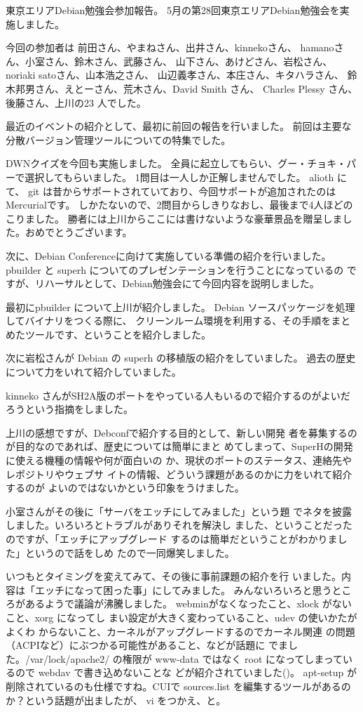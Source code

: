 \documentclass[mingoth,a4paper]{jsarticle}
\begin{document}
東京エリアDebian勉強会参加報告。
5月の第28回東京エリアDebian勉強会を実施しました。

今回の参加者は
前田さん、やまねさん、出井さん、kinnekoさん、
hamanoさん、小室さん、鈴木さん、武藤さん、
山下さん、あけどさん、岩松さん、
noriaki satoさん、山本浩之さん、
山辺義孝さん、本庄さん、キタハラさん、
鈴木邦男さん、えとーさん、荒木さん、David Smith さん、
Charles Plessy さん、後藤さん、上川の23 人でした。

最近のイベントの紹介として、最初に前回の報告を行いました。
前回は主要な分散バージョン管理ツールについての特集でした。

DWNクイズを今回も実施しました。
全員に起立してもらい、グー・チョキ・パーで選択してもらいました。
1問目は一人しか正解しませんでした。
alioth にて、 git は昔からサポートされていており、今回サポートが追加されたのはMercurialです。
しかたないので、2問目からしきりなおし、最後まで4人ほどのこりました。
勝者には上川からここには書けないような豪華景品を贈呈しました。おめでとうございます。


次に、Debian Conferenceに向けて実施している準備の紹介を行いました。
pbuilder と superh についてのプレゼンテーションを行うことになっているの
ですが、リハーサルとして、Debian勉強会にて今回内容を説明しました。

最初にpbuilder について上川が紹介しました。
Debian ソースパッケージを処理してバイナリをつくる際に、
クリーンルーム環境を利用する、その手順をまとめたツールです、ということを紹介しました。


次に岩松さんが Debian の superh の移植版の紹介をしていました。
過去の歴史について力をいれて紹介していました。

kinneko さんがSH2A版のポートをやっている人もいるので紹介するのがよいだろうという指摘をしました。

上川の感想ですが、Debconfで紹介する目的として、新しい開発
者を募集するのが目的なのであれば、歴史については簡単にまと
めてしまって、SuperHの開発に使える機種の情報や何が面白いの
か、現状のポートのステータス、連絡先やレポジトリやウェブサ
イトの情報、どういう課題があるのかに力をいれて紹介するのが
よいのではないかという印象をうけました。

小室さんがその後に「サーバをエッチにしてみました」という題
でネタを披露しました。いろいろとトラブルがありそれを解決し
ました、ということだったのですが、「エッチにアップグレード
するのは簡単だということがわかりました」というので話をしめ
たので一同爆笑しました。


いつもとタイミングを変えてみて、その後に事前課題の紹介を行
いました。内容は「エッチになって困った事」にしてみました。
みんないろいろと思うところがあるようで議論が沸騰しました。
webminがなくなったこと、xlock がないこと、xorg になってし
まい設定が大きく変わっていること、udev の使いかたがよくわ
からないこと、カーネルがアップグレードするのでカーネル関連
の問題（ACPIなど）にぶつかる可能性があること、などが話題に
でました。/var/lock/apache2/ の権限が www-data ではなく 
root になってしまっているので webdav で書き込めないことな
どが紹介されていました()。
apt-setup が削除されているのも仕様ですね。CUIで sources.list を編集するツールがあるのか？という話題が出ましたが、 vi をつかえ、と。
\end{document}
